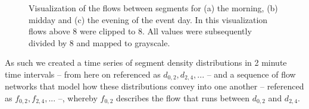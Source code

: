 \documentclass[12pt,a4paper,twoside,openright]{book}
\begin{document}
\begin{figure}
	\begin{center}
	\end{center}
	\caption[Visualization of the flows between segments]{Visualization of the flows between segments for (a) the morning, (b) midday and (c) the evening of the event day. In this visualization flows above 8 were clipped to 8. All values were subsequently divided by 8 and mapped to grayscale.}
	\label{fig:flows}
\end{figure}

As such we created a time series of segment density distributions in 2 minute time intervals -- from here on referenced as $d_{0,2}, d_{2,4}, ...$ -- and a sequence of flow networks that model how these distributions convey into one another -- referenced as $f_{0,2}, f_{2,4}, ...$ --, whereby $f_{0,2}$ describes the flow that runs between $d_{0,2}$ and $d_{2,4}$.
\end{document}
